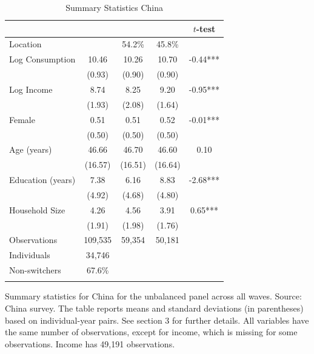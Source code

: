 \begin{table}[htbp] \centering \caption{Summary Statistics China}\label{tab:summary_stats_CHN_unb_3waves} \begin{threeparttable} \begin{tabular}{l cccc} \toprule
 &  &  &  & $t$-test \\
\midrule
Location &  &   54.2\% &   45.8\% &  \\  \addlinespace \addlinespace
Log Consumption & 10.46 & 10.26 & 10.70 & -0.44*** \\
 & (0.93) & (0.90) & (0.90) &  \\  \addlinespace
Log Income & 8.74 & 8.25 & 9.20 & -0.95*** \\
 & (1.93) & (2.08) & (1.64) &  \\  \addlinespace
Female & 0.51 & 0.51 & 0.52 & -0.01*** \\
 & (0.50) & (0.50) & (0.50) &  \\  \addlinespace
Age (years) & 46.66 & 46.70 & 46.60 & 0.10 \\
 & (16.57) & (16.51) & (16.64) &  \\  \addlinespace
Education (years) & 7.38 & 6.16 & 8.83 & -2.68*** \\
 & (4.92) & (4.68) & (4.80) &  \\  \addlinespace
Household Size & 4.26 & 4.56 & 3.91 & 0.65*** \\
 & (1.91) & (1.98) & (1.76) &  \\  \addlinespace


\cmidrule{2-5}
Observations & 109,535 & 59,354 & 50,181 &  \\  \addlinespace
Individuals & 34,746 &  &  &  \\
Non-switchers &   67.6\% &  &  &  \\  \addlinespace
\bottomrule \end{tabular} \begin{tablenotes}[flushleft] \footnotesize \item{Summary statistics for China for the unbalanced panel across all waves. Source: China survey. The table reports means and standard deviations (in parentheses) based on individual-year pairs. See section 3 for further details. All variables have the same number of observations, except for income, which is missing for some observations. Income has 49,191 observations.} \end{tablenotes} \end{threeparttable} \end{table}